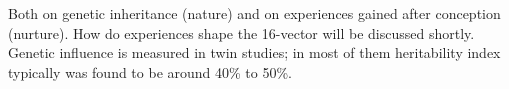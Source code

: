 \documentclass[11pt]{article}
\theoremstyle{remark}
\theoremstyle{definition}
\begin{document}
Both on genetic inheritance (nature) and on experiences gained after conception (nurture). How do experiences shape the 16-vector will be discussed shortly. Genetic influence is measured in twin studies; in most of them heritability index typically was found to be around 40\% to 50\%. %













\end{document}
